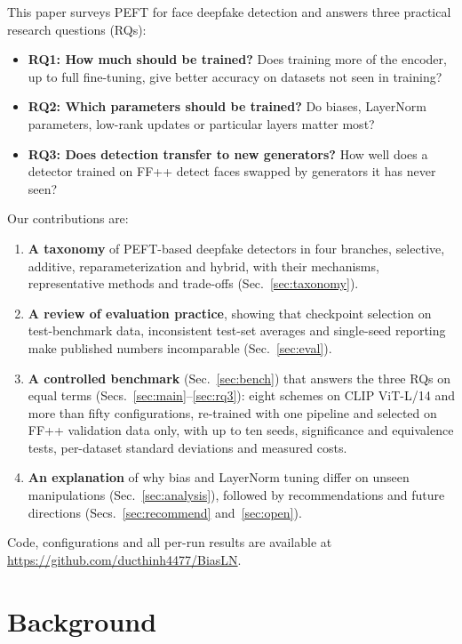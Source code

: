 \documentclass[fonts]{icst}
\begin{document}
This paper surveys PEFT for face deepfake detection and answers three practical research questions (RQs):
\begin{itemize}[leftmargin=*, topsep=2pt, itemsep=2pt]
    \item \textbf{RQ1: How much should be trained?} Does training more of the encoder, up to full fine-tuning, give better accuracy on datasets not seen in training?
    \item \textbf{RQ2: Which parameters should be trained?} Do biases, LayerNorm parameters, low-rank updates or particular layers matter most?
    \item \textbf{RQ3: Does detection transfer to new generators?} How well does a detector trained on FF++ detect faces swapped by generators it has never seen?
\end{itemize}
Our contributions are:
\begin{enumerate}
    \item \textbf{A taxonomy} of PEFT-based deepfake detectors in four branches, selective, additive, reparameterization and hybrid, with their mechanisms, representative methods and trade-offs (Sec.~\ref{sec:taxonomy}).
    \item \textbf{A review of evaluation practice}, showing that checkpoint selection on test-benchmark data, inconsistent test-set averages and single-seed reporting make published numbers incomparable (Sec.~\ref{sec:eval}).
    \item \textbf{A controlled benchmark} (Sec.~\ref{sec:bench}) that answers the three RQs on equal terms (Secs.~\ref{sec:main}--\ref{sec:rq3}): eight schemes on CLIP ViT-L/14 and more than fifty configurations, re-trained with one pipeline and selected on FF++ validation data only, with up to ten seeds, significance and equivalence tests, per-dataset standard deviations and measured costs.
    \item \textbf{An explanation} of why bias and LayerNorm tuning differ on unseen manipulations (Sec.~\ref{sec:analysis}), followed by recommendations and future directions (Secs.~\ref{sec:recommend} and~\ref{sec:open}).
\end{enumerate}
Code, configurations and all per-run results are available at \href{https://github.com/ducthinh4477/BiasLN}{https://github.com/ducthinh4477/BiasLN}.

\section{Background}
\label{sec:background}
\end{document}
